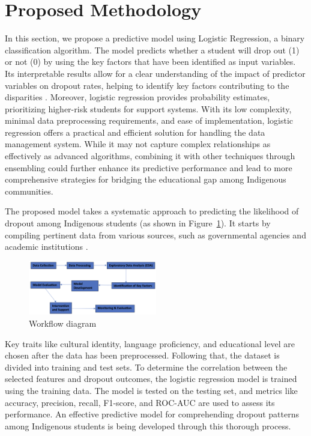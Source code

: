 \documentclass[conference]{IEEEtran}
\begin{document}
\section{\textbf{Proposed Methodology}}
In this section, we propose a predictive model using Logistic Regression, a
binary classification algorithm. The model predicts whether a student will
drop out (1) or not (0) by using the key factors that have been identified
as input variables. Its interpretable results allow for a clear understanding of the impact of predictor variables on dropout rates, helping to identify key factors contributing to the disparities \cite{r13}. Moreover, logistic regression provides probability estimates, prioritizing higher-risk students for support systems. With its low complexity, minimal data preprocessing requirements, and ease of implementation, logistic regression offers a practical and efficient solution for handling the data management system. While it may not capture complex relationships as effectively as advanced algorithms, combining it with other techniques through ensembling could further enhance its predictive performance and lead to more comprehensive strategies for bridging the educational gap among Indigenous communities.

The proposed model takes a systematic approach to predicting the likelihood of dropout among Indigenous students (as shown in Figure~\ref{fig:flowdiagram}). It starts by compiling pertinent
data from various sources, such as governmental agencies and academic
institutions \cite{r14}. 
\begin{figure}[H]
	\centering 
	\includegraphics[width=0.5\textwidth, angle=0]{images/FlowDiagram.png}	
	\caption{Workflow diagram} 
	\label{fig:flowdiagram}
\end{figure}

Key traits like cultural identity, language proficiency, and educational level are chosen after the data has been preprocessed. Following that, the dataset is divided into training and test sets. To determine the correlation between the selected features and dropout outcomes, the logistic regression model is trained using the training data. The model is tested on the testing set, and metrics like accuracy, precision, recall, F1-score, and ROC-AUC \cite{r15} are used to assess its performance. An effective predictive model for comprehending dropout patterns among Indigenous students is being developed through this thorough process.
\end{document}
